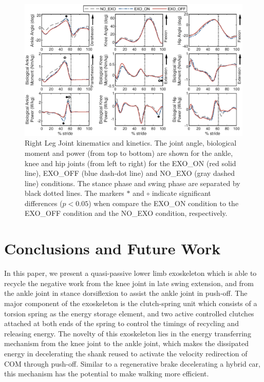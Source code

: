 \documentclass[twocolumn,cleanfoot,10pt]{asme2ej}
\begin{document}
\begin{figure}[th]
	\centering
	\includegraphics[width=17cm]{compare.eps}
	\caption{Right Leg Joint kinematics and kinetics.
		The joint angle, biological moment and power (from top to bottom) are shown for the ankle, knee and hip joints (from left to right) for the EXO\_ON (red solid line), EXO\_OFF (blue dash-dot line) and NO\_EXO (gray dashed line) conditions.
		The stance phase and swing phase are separated by black dotted lines.
		The markers $*$ and $\circ$ indicate significant differences ($p<0.05$) when compare the EXO\_ON condition to the EXO\_OFF condition and the NO\_EXO condition, respectively.}
	\label{fig:kinetics_r}
\end{figure}

\section{Conclusions and Future Work}
\label{sec:discussion}
In this paper, we present a quasi-passive lower limb exoskeleton which is able to recycle the negative work from the knee joint in late swing extension, and from the ankle joint in stance dorsiflexion to assist the ankle joint in push-off.
The major component of the exoskeleton is the clutch-spring unit which consists of a torsion spring as the energy storage element, and two active controlled clutches attached at both ends of the spring to control the timings of recycling and releasing energy.
The novelty of this exoskeleton lies in the energy transferring mechanism from the knee joint to the ankle joint, which makes the dissipated energy in decelerating the shank reused to activate the velocity redirection of COM through push-off.
Similar to a regenerative brake decelerating a hybrid car, this mechanism has the potential to make walking more efficient.
\end{document}
